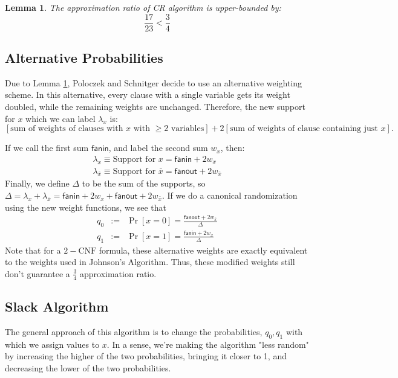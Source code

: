 \documentclass[11pt,letter]{article}
\newtheorem{lemma}[theorem]{Lemma}
\numberwithin{theorem}{section}
\begin{document}
\begin{lemma}
\label{L:1}
The approximation ratio of CR algorithm is upper-bounded by:
$$\frac{17}{23} < \frac{3}{4}$$

\end{lemma}

\subsection*{Alternative Probabilities}
Due to Lemma \ref{L:1}, Poloczek and Schnitger decide to use an alternative weighting scheme. In this alternative, every clause with a single variable gets its weight doubled, while the remaining weights are unchanged. Therefore, the new support for $x$ which we can label $\lambda_x$ is:
\[[\textrm{sum of weights of clauses with }x\textrm{ with }\ge 2\textrm{ variables}] + 2[\textrm{sum of weights of clause containing just }x].\]

If we call the first sum $\mathsf{fanin}$, and label the second sum $w_x$, then:
\begin{eqnarray*}
\lambda_x \equiv \textrm{Support for } x = \mathsf{fanin} + 2w_x\\
\lambda_{\bar{x}} \equiv \textrm{Support for } \bar{x} = \mathsf{fanout} + 2w_{\bar{x}}
\end{eqnarray*}
Finally, we define $\Delta$ to be the sum of the supports, so $\Delta = \lambda_{x} + \lambda_{\bar{x}} = \mathsf{fanin} + 2w_x + \mathsf{fanout} + 2w_{\bar{x}}$. If we do a canonical randomization  using the new weight functions, we see that
\begin{eqnarray*}
q_0 &:=& \Pr[x=0] = \frac{\mathsf{fanout} + 2w_{\bar{x}}}{\Delta}\\
q_1 &:=& \Pr[x=1] = \frac{\mathsf{fanin} + 2w_x}{\Delta}
\end{eqnarray*}
Note that for a $2-\text{CNF}$ formula, these alternative weights are exactly equivalent to the weights used in Johnson's Algorithm. Thus, these modified weights still don't guarantee a $\frac{3}{4}$ approximation ratio.

\subsection*{Slack Algorithm}
The general approach of this algorithm is to change the probabilities, $q_0, q_1$ with which we assign values to $x$. In a sense, we're making the algorithm "less random" by increasing the higher of the two probabilities, bringing it closer to 1, and decreasing the lower of the two probabilities.
\end{document}
